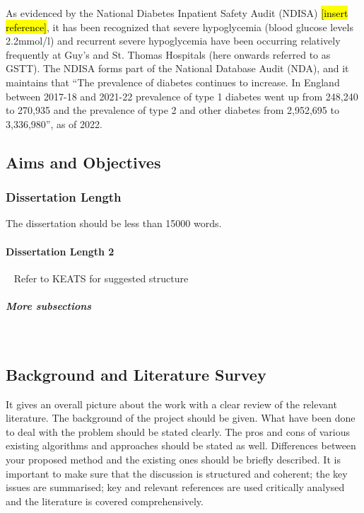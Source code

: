 \begin{flushleft}
As evidenced by the National Diabetes Inpatient Safety Audit (NDISA) \hl{[insert reference]}, it has been recognized that severe hypoglycemia (blood glucose levels  2.2mmol/l) and recurrent severe hypoglycemia have been occurring relatively frequently at Guy’s and St. Thomas Hospitals (here onwards referred to as GSTT). The NDISA forms part of the National Database Audit (NDA), and it maintains that “The prevalence of diabetes continues to increase. In England between 2017-18 and 2021-22 prevalence of type 1 diabetes went up from 248,240 to 270,935 and the prevalence of type 2 and other diabetes from 2,952,695 to 3,336,980”, as of 2022. 

\end{flushleft}

\subsection{Aims and Objectives} 



\subsubsection{Dissertation Length}
	The dissertation should be less than 15000 words.
	
\paragraph{Dissertation Length 2} ~\newline
	Refer to KEATS for suggested structure
	
\noindent \subparagraph{More subsections}~\newline
	
	

\subsection{Background and Literature Survey} \label{sub:background}
 It gives an overall picture about the work with a clear review of the relevant literature.  The background of the project should be given.  What have been done to deal with the problem should be stated clearly.  The pros and cons of various existing algorithms and approaches should be stated as well.  Differences between your proposed method and the existing ones should be briefly described. It is important to make sure that the discussion is structured and coherent; the key issues are summarised; key and relevant references are used critically analysed and the literature is covered comprehensively.

